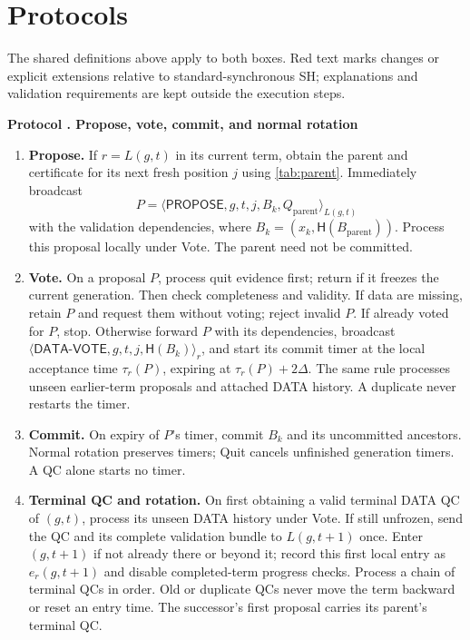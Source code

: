 \documentclass[11pt,a4paper]{article}
\newcommand{\RR}[1]{{\color{rrRed}#1}}
\newcommand{\Hash}{\mathsf H}
\newcommand{\tagg}[1]{\ensuremath{\mathsf{#1}}}
\newcounter{protocol}
\newenvironment{protocol}[2]{\refstepcounter{protocol}\label{#1}
\begin{mdframed}[nobreak=true,linewidth=.6pt,skipabove=8pt,skipbelow=8pt,
innertopmargin=7pt,innerbottommargin=7pt]\small
\textbf{Protocol \theprotocol. #2}\par\smallskip}{\end{mdframed}}
\begin{document}
\section{Protocols}
\label{sec:protocols}
The shared definitions above apply to both boxes. Red text marks changes
or explicit extensions relative to standard-synchronous SH; explanations
and validation requirements are kept outside the execution steps.

\begin{protocol}{alg:steady}{Propose, vote, commit, and normal rotation}
\begin{enumerate}[label=\textbf{\arabic*)},itemsep=6pt]
\item \textbf{Propose.} If $r=L(g,t)$ in its current term, obtain the
parent and certificate for its next fresh position $j$
\RR{using \cref{tab:parent}}. Immediately broadcast
\[
 P=\langle\tagg{PROPOSE},g,t,j,B_k,Q_{\mathrm{parent}}\rangle_{L(g,t)}
\]
with the validation dependencies, where
$B_k=(x_k,\Hash(B_{\mathrm{parent}}))$.
Process this proposal locally under Vote. The parent need not be committed.

\item \textbf{Vote.} On a proposal $P$, \RR{process quit evidence first;
return if it freezes the current generation}. Then check completeness and validity. If data are
missing, retain $P$ and request them without voting; reject invalid $P$.
If already voted for $P$, stop. Otherwise forward $P$ with its dependencies,
broadcast
$\langle\tagg{DATA\mbox{-}VOTE},g,t,j,\Hash(B_k)\rangle_r$,
and start its commit timer at the local acceptance time $\tau_r(P)$,
expiring at $\tau_r(P)+2\Delta$.
\RR{The same rule processes unseen earlier-term proposals and attached
DATA history. A duplicate never restarts the timer.}

\item \textbf{Commit.} On expiry of $P$'s timer, commit $B_k$ and its
uncommitted ancestors. \RR{Normal rotation preserves timers; Quit cancels
unfinished generation timers. A QC alone starts no timer.}

\item \textbf{Terminal QC and rotation.} \RR{On first obtaining a valid
terminal DATA QC of $(g,t)$, process its unseen DATA history under Vote.
If still unfrozen, send the QC and its complete validation bundle to
$L(g,t+1)$ once. Enter $(g,t+1)$ if not already there or beyond it;
record this first local entry as $e_r(g,t+1)$ and disable completed-term
progress checks. Process a chain of terminal QCs in order. Old or duplicate
QCs never move the term backward or reset an entry time. The successor's
first proposal carries its parent's terminal QC.}
\end{enumerate}
\end{protocol}
\end{document}
